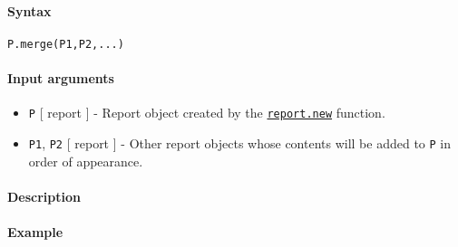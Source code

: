 


	\paragraph{Syntax}

\begin{verbatim}
P.merge(P1,P2,...)
\end{verbatim}

\paragraph{Input arguments}

\begin{itemize}
\item
  \texttt{P} {[} report {]} - Report object created by the
  \href{report/new}{\texttt{report.new}} function.
\item
  \texttt{P1}, \texttt{P2} {[} report {]} - Other report objects whose
  contents will be added to \texttt{P} in order of appearance.
\end{itemize}

\paragraph{Description}

\paragraph{Example}


